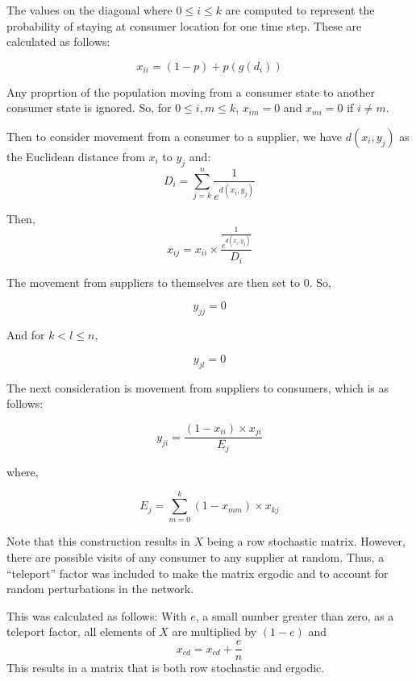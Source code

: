 \documentclass[twoside,twocolumn]{article}
\begin{document}
The values on the diagonal where $0 \leq i \leq k$ are computed to represent the probability of staying at consumer location for one time step.
These are calculated as follows:

$$x_{ii} = (1-p) + p(g(d_{i}))$$

Any proprtion of the population moving from a consumer state to another consumer state is ignored. %
So, for $0 \leq i,m \leq k$, $x_{im} = 0$ and $x_{mi} = 0$ if $i \neq m$.

Then to consider movement from a consumer to a supplier, we have $d(x_i, y_j)$ as the Euclidean distance from $x_i$ to $y_j$ and:
$$D_i = \sum_{j=k}^{n} \frac{1}{e^{d(x_i,y_j)}}$$

Then,
$$x_{ij} = x_{ii} \times \frac{\frac{1}{e^{d(x_i,y_j)}}}{D_i}$$

The movement from suppliers to themselves are then set to 0.
So,

$$y_{jj} = 0$$

And for $k < l \leq n$,

$$y_{jl} = 0$$ %

The next consideration is movement from suppliers to consumers, which is as follows:

$$y_{ji} = \frac{(1-x_{ii})\times x_{ji}}{E_j}$$

where, 

$$E_j = \sum_{m=0}^{k} (1-x_{mm})\times x_{kj}$$

Note that this construction results in $X$ being a row stochastic matrix.
However, there are possible visits of any consumer to any supplier at random.
Thus, a ``teleport'' factor was included to make the matrix ergodic and to account for random perturbations in the network.

This was calculated as follows:
With $e$, a small number greater than zero, as a teleport factor, all elements of $X$ are multiplied by $(1-e)$ and 
$$x_{cd} = x_{cd} + \frac{e}{n}$$
This results in a matrix that is both row stochastic and ergodic.







\end{document}
